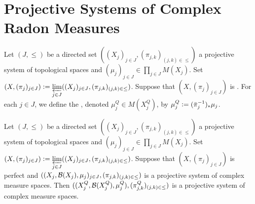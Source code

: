 \documentclass{book}
\begin{document}
	
	
	
	
	
	
	
	
	
	
	
	
	
	
	
	
	
	
	
	
	
	
	
	
	
	
	
	
	
	
	
	
	
	
	
	
	
	
	
	
	
	
	
	
	
	\newpage
	\section{Projective Systems of Complex Radon Measures}
	
	\begin{defn} 
		Let $(J, {\leq})$ be a directed set $((X_j)_{j \in J}, (\pi_{j,k})_{(j,k) \in \leq})$ a projective system of topological spaces and $(\mu_j)_{j \in J} \in \prod\limits_{j \in J} M(X_j)$. Set $(X, (\pi_j)_{j \in J}) \vcentcolon= \varprojlim\limits_{j \in J} ((X_j)_{j \in J}, (\pi_{j,k})_{(j,k) \in \leq})$. Suppose that $(X, (\pi_j)_{j \in J})$ is . For each $j \in J$, we define the , denoted $\mu^Q_j \in M(X^Q_j)$, by $\mu^Q_j \vcentcolon= (\bar{\pi}_j^{-1})_*\mu_j$. 
	\end{defn}
	
	\begin{ex} 
		Let $(J, {\leq})$ be a directed set $((X_j)_{j \in J}, (\pi_{j,k})_{(j,k) \in {\leq}})$ a projective system of topological spaces and $(\mu_j)_{j \in J} \in \prod\limits_{j \in J} M(X_j)$. Set $(X, (\pi_j)_{j \in J}) \vcentcolon= \varprojlim\limits_{j \in J} ((X_j)_{j \in J}, (\pi_{j,k})_{(j,k) \in {\leq}})$. Suppose that $(X, (\pi_j)_{j \in J})$ is perfect and $((X_j, \mathcal{B}(X_j), \mu_j)_{j \in J}, (\pi_{j,k})_{(j,k) \in {\leq}})$ is a projective system of complex measure spaces. Then $((X^Q_j, \mathcal{B}(X^Q_j), \mu^Q_j), (\pi^Q_{j,k})_{(j,k) \in {\leq}})$ is a  projective system of complex measure spaces.
	\end{ex}
	
\end{document}
